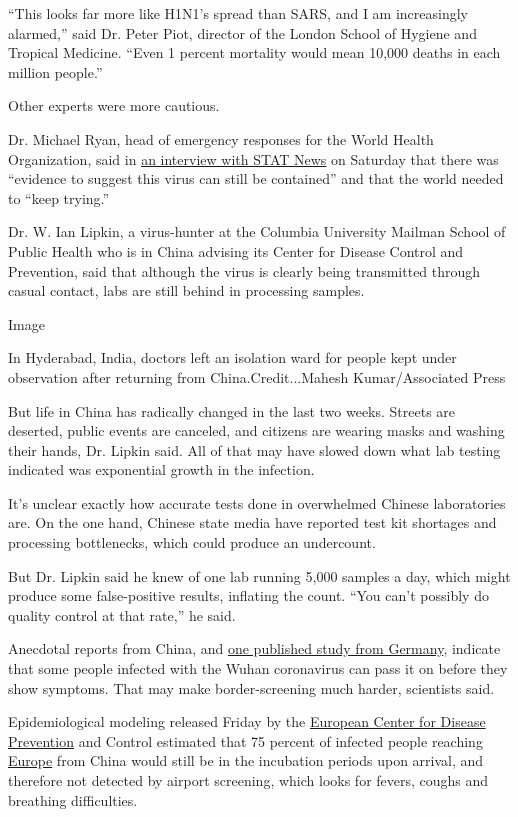 ``This looks far more like H1N1's spread than SARS, and I am
increasingly alarmed,'' said Dr. Peter Piot, director of the London
School of Hygiene and Tropical Medicine. ``Even 1 percent mortality
would mean 10,000 deaths in each million people.''

Other experts were more cautious.

Dr. Michael Ryan, head of emergency responses for the World Health
Organization, said in
\href{https://www.statnews.com/2020/02/01/top-who-official-says-not-too-late-to-stop-coronavirus-outbreak/}{an
interview with STAT News} on Saturday that there was ``evidence to
suggest this virus can still be contained'' and that the world needed to
``keep trying.''

Dr. W. Ian Lipkin, a virus-hunter at the Columbia University Mailman
School of Public Health who is in China advising its Center for Disease
Control and Prevention, said that although the virus is clearly being
transmitted through casual contact, labs are still behind in processing
samples.

Image

In Hyderabad, India, doctors left an isolation ward for people kept
under observation after returning from China.Credit...Mahesh
Kumar/Associated Press

But life in China has radically changed in the last two weeks. Streets
are deserted, public events are canceled, and citizens are wearing masks
and washing their hands, Dr. Lipkin said. All of that may have slowed
down what lab testing indicated was exponential growth in the infection.

It's unclear exactly how accurate tests done in overwhelmed Chinese
laboratories are. On the one hand, Chinese state media have reported
test kit shortages and processing bottlenecks, which could produce an
undercount.

But Dr. Lipkin said he knew of one lab running 5,000 samples a day,
which might produce some false-positive results, inflating the count.
``You can't possibly do quality control at that rate,'' he said.

Anecdotal reports from China, and
\href{https://www.scientificamerican.com/article/study-reports-first-case-of-coronavirus-spread-by-asymptomatic-person/}{one
published study from Germany}, indicate that some people infected with
the Wuhan coronavirus can pass it on before they show symptoms. That may
make border-screening much harder, scientists said.

Epidemiological modeling released Friday by the
\href{https://www.nytimes3xbfgragh.onion/2020/02/10/world/europe/coronavirus-europe.html}{European
Center for Disease Prevention} and Control estimated that 75 percent of
infected people reaching
\href{https://www.nytimes3xbfgragh.onion/2020/02/10/world/europe/coronavirus-europe.html}{Europe}
from China would still be in the incubation periods upon arrival, and
therefore not detected by airport screening, which looks for fevers,
coughs and breathing difficulties.


